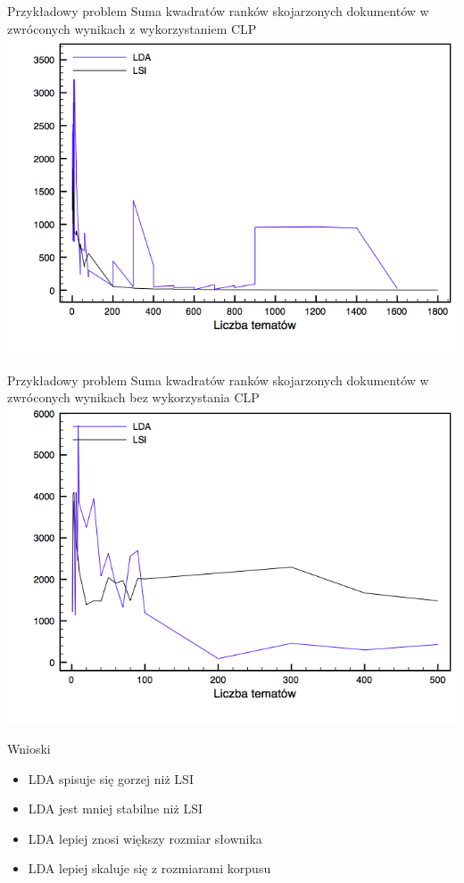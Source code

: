 \documentclass{beamer}
\begin{document}
\begin{frame}{Przykładowy problem}
  \pause
  Suma kwadratów ranków skojarzonych dokumentów w zwróconych wynikach z wykorzystaniem CLP
  \includegraphics[width=\linewidth]{../doc/gfx/ranks_stemming.png}
\end{frame}

\begin{frame}{Przykładowy problem}
  Suma kwadratów ranków skojarzonych dokumentów w zwróconych wynikach bez wykorzystania CLP
  \includegraphics[width=\linewidth]{../doc/gfx/ranks_no_stemming.png}
\end{frame}

\begin{frame}{Wnioski}
  \begin{itemize}
    \pause
    \item LDA spisuje się gorzej niż LSI
    \pause
    \item LDA jest mniej stabilne niż LSI
    \pause
    \item LDA lepiej znosi większy rozmiar słownika
    \pause
    \item LDA lepiej skaluje się z rozmiarami korpusu
  \end{itemize}
\end{frame}
\end{document}
